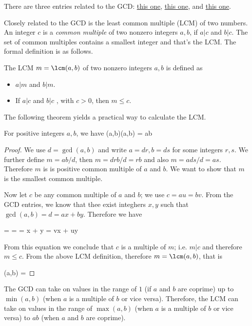 There are three entries related to the GCD: \href{2017-04-26:entry}{this one}, \href{2017-05-01:entry}{this one}, and \href{2017-09-28:entry}{this one}.

Closely related to the GCD is the least common multiple (LCM) of two numbers. An integer $c$ is a \emph{common multiple} of two nonzero integers $a, b$, if $a | c$ and $b | c$. The set of common multiples contains a smallest integer and that's the LCM. The formal definition is as follows.

The LCM $m = \lcm(a,b)$ of two nonzero integers $a, b$ is defined as
\begin{itemize}
\item $a|m$ and $b|m$.
\item If $a|c$ and $b|c$ , with $c > 0$, then $m \leq c$.
\end{itemize}

The following theorem yields a practical way to calculate the LCM.

\begin{theorem}
  For positive integers $a, b$, we have
  \bee
  \gcd(a,b)\lcm(a,b) = ab
  \eee
\end{theorem}

\begin{proof}
  We use $d = \gcd(a,b)$ and write $a = dr, b = ds$ for some integers $r,s$. We further define $m = ab / d$, then $m = dr b / d = rb$ and also $m = a ds / d = as$. Therefore $m$ is is positive common multiple of $a$ and $b$. We want to show that $m$ is the smallest common multiple.

  Now let $c$ be any common multiple of $a$ and $b$; we use $c = au = bv$. From the GCD entries, we know that thee exist integhers $x, y$ such that $\gcd(a,b) = d = ax + by$. Therefore we have

  \bee
   =  =  = x + y = vx + uy
  \eee

  From this equation we conclude that $c$ is a multiple of $m$; i.e. $m | c$ and therefore $m \leq c$. From the above LCM definition, therefore $m = \lcm(a,b)$, that is

  \bee
  \lcm(a,b) = 
  \eee
\end{proof}

The GCD can take on values in the range of $1$ (if $a$ and $b$ are coprime) up to $\min(a,b)$ (when $a$ is a multiple of $b$ or vice versa). Therefore, the LCM can take on values in the range of $\max(a,b)$ (when $a$ is a multiple of $b$ or vice versa) to $ab$ (when $a$ and $b$ are coprime).

